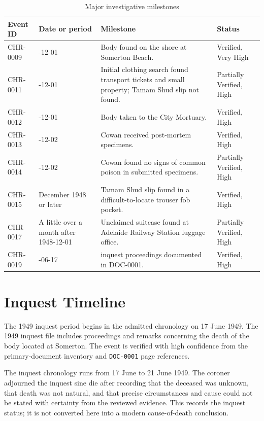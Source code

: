 \begin{table}[htbp]
\centering
\caption{Major investigative milestones}
\label{tab:chronology-investigative-milestones}
\begin{tabularx}{\textwidth}{>{\RaggedRight\arraybackslash}p{}>{\RaggedRight\arraybackslash}p{}>{\RaggedRight\arraybackslash}X >{\RaggedRight\arraybackslash}p{}}
\toprule
Event ID & Date or period & Milestone & Status \\
\midrule
CHR-0009 & 1948-12-01 & Body found on the shore at Somerton Beach. & Verified, Very High \\
CHR-0011 & 1948-12-01 & Initial clothing search found transport tickets and small property; Tamam Shud slip not found. & Partially Verified, High \\
CHR-0012 & 1948-12-01 & Body taken to the City Mortuary. & Verified, High \\
CHR-0013 & 1948-12-02 & Cowan received post-mortem specimens. & Verified, High \\
CHR-0014 & 1948-12-02 & Cowan found no signs of common poison in submitted specimens. & Partially Verified, High \\
CHR-0015 & December 1948 or later & Tamam Shud slip found in a difficult-to-locate trouser fob pocket. & Verified, High \\
CHR-0017 & A little over a month after 1948-12-01 & Unclaimed suitcase found at Adelaide Railway Station luggage office. & Partially Verified, High \\
CHR-0019 & 1949-06-17 & 1949 inquest proceedings documented in DOC-0001. & Verified, High \\
\bottomrule
\end{tabularx}
\end{table}

\section{Inquest Timeline}

The 1949 inquest period begins in the admitted chronology on 17 June 1949. The 1949 inquest file includes proceedings and remarks concerning the death of the body located at Somerton. The event is verified with high confidence from the primary-document inventory and \texttt{DOC-0001} page references.

The inquest chronology runs from 17 June to 21 June 1949. The coroner adjourned the inquest sine die after recording that the deceased was unknown, that death was not natural, and that precise circumstances and cause could not be stated with certainty from the reviewed evidence. This records the inquest status; it is not converted here into a modern cause-of-death conclusion.

